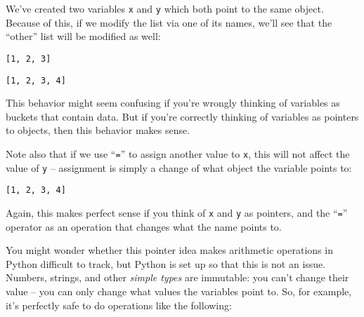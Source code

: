 We've created two variables \texttt{x} and \texttt{y} which both point
to the same object. Because of this, if we modify the list via one of
its names, we'll see that the ``other'' list will be modified as well:

\begin{Shaded}
\begin{Highlighting}[]
\end{Highlighting}
\end{Shaded}

\begin{verbatim}
[1, 2, 3]
\end{verbatim}

\begin{Shaded}
\begin{Highlighting}[]
\NormalTok{) }
\end{Highlighting}
\end{Shaded}

\begin{verbatim}
[1, 2, 3, 4]
\end{verbatim}

This behavior might seem confusing if you're wrongly thinking of
variables as buckets that contain data. But if you're correctly thinking
of variables as pointers to objects, then this behavior makes sense.

Note also that if we use ``\texttt{=}'' to assign another value to
\texttt{x}, this will not affect the value of \texttt{y} -- assignment
is simply a change of what object the variable points to:

\begin{Shaded}
\begin{Highlighting}[]
\OperatorTok{=} 
\end{Highlighting}
\end{Shaded}

\begin{verbatim}
[1, 2, 3, 4]
\end{verbatim}

Again, this makes perfect sense if you think of \texttt{x} and
\texttt{y} as pointers, and the ``\texttt{=}'' operator as an operation
that changes what the name points to.

You might wonder whether this pointer idea makes arithmetic operations
in Python difficult to track, but Python is set up so that this is not
an issue. Numbers, strings, and other \emph{simple types} are immutable:
you can't change their value -- you can only change what values the
variables point to. So, for example, it's perfectly safe to do
operations like the following:

